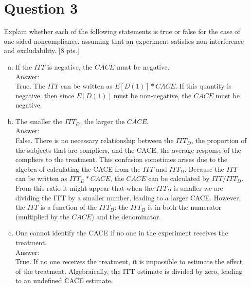 \documentclass[11pt,notitlepage]{article}\usepackage[]{graphicx}\usepackage[]{color}
\begin{document}
\section*{Question 3}
Explain whether each of the following statements is true or false for the case of one-sided noncompliance, assuming that an experiment satisfies non-interference and excludability. [8 pts.]
\begin{enumerate}[a)]
\item If the $ITT$ is negative, the $CACE$ must be negative.\\
Answer:\\
True. The $ITT$ can be written as $E[D(1)]*CACE$. If this quantity is negative, then since $E[D(1)]$ must be non-negative, the $CACE$ must be negative.  
\item The smaller the $ITT_D$, the larger the $CACE$.\\
Answer:\\
False. There is no necessary relationship between the $ITT_D$, the proportion of the subjects that are compliers, and the CACE, the average response of the compliers to the treatment. This confusion sometimes arises due to the algebra of calculating the CACE from the $ITT$ and $ITT_D$. Because the $ITT$ can be written as $ITT_D*CACE$, the $CACE$ can be calculated by $ITT/ITT_D$. From this ratio it might appear that when the $ITT_D$ is smaller we are dividing the ITT by a smaller number, leading to a larger CACE. However, the $ITT$ is a function of the $ITT_D$: the $ITT_D$ is in both the numerator (multiplied by the $CACE$) and the denominator.
\item One cannot identify the CACE if no one in the experiment receives the treatment.\\
Answer:\\
True. If no one receives the treatment, it is impossible to estimate the effect of the treatment. Algebraically, the ITT estimate is divided by zero, leading to an undefined CACE estimate. 
\end{enumerate}
\end{document}
